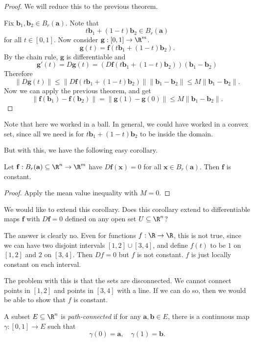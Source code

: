 \documentclass[a4paper]{article}
\begin{document}
\begin{proof}
  We will reduce this to the previous theorem.

  Fix $\mathbf{b}_1, \mathbf{b}_2 \in B_r(\mathbf{a})$. Note that
  \[
    t\mathbf{b}_1 + (1 - t) \mathbf{b}_2 \in B_r(\mathbf{a})
  \]
  for all $t \in [0, 1]$. Now consider $\mathbf{g}: [0, 1] \to \R^m$.
  \[
    \mathbf{g}(t) = \mathbf{f}(t \mathbf{b}_1 + (1 - t)\mathbf{b}_2).
  \]
  By the chain rule, $\mathbf{g}$ is differentiable and
  \[
    \mathbf{g}'(t) = D\mathbf{g}(t) = (D\mathbf{f} (t \mathbf{b}_1 + (1 - t) \mathbf{b}_2))(\mathbf{b}_1 - \mathbf{b}_2)
  \]
  Therefore
  \[
    \|D \mathbf{g}(t)\| \leq \|D \mathbf{f}(t \mathbf{b}_1 + (1 - t)\mathbf{b}_2)\| \|\mathbf{b}_1 - \mathbf{b}_2\| \leq M \|\mathbf{b}_1 - \mathbf{b}_2\|.
  \]
  Now we can apply the previous theorem, and get
  \[
    \|\mathbf{f}(\mathbf{b}_1) - \mathbf{f}(\mathbf{b}_2)\| = \|\mathbf{g}(1) - \mathbf{g}(0)\| \leq M\|\mathbf{b}_1 - \mathbf{b}_2\|.
  \]
\end{proof}
Note that here we worked in a ball. In general, we could have worked in a convex set, since all we need is for $t \mathbf{b}_1 + (1 - t)\mathbf{b}_2$ to be inside the domain.

But with this, we have the following easy corollary.
\begin{cor}
  Let $\mathbf{f}: B_r(\mathbf{a}) \subseteq \R^n \to \R^m$ have $D\mathbf{f}(\mathbf{x}) = 0$ for all $\mathbf{x} \in B_r(\mathbf{a})$. Then $\mathbf{f}$ is constant.
\end{cor}

\begin{proof}
  Apply the mean value inequality with $M = 0$.
\end{proof}

We would like to extend this corollary. Does this corollary extend to differentiable maps $\mathbf{f}$ with $D\mathbf{f} = 0$ defined on any open set $U \subseteq \R^n$?

The answer is clearly no. Even for functions $f: \R \to \R$, this is not true, since we can have two disjoint intervals $[1, 2] \cup [3, 4]$, and define $f(t)$ to be $1$ on $[1, 2]$ and $2$ on $[3, 4]$. Then $Df = 0$ but $f$ is not constant. $f$ is just locally constant on each interval.

The problem with this is that the sets are disconnected. We cannot connect points in $[1, 2]$ and points in $[3, 4]$ with a line. If we can do so, then we would be able to show that $f$ is constant.

\begin{defi}
  A subset $E \subseteq \R^n$ is \emph{path-connected} if for any $\mathbf{a}, \mathbf{b} \in E$, there is a continuous map $\gamma: [0, 1] \to E$ such that
  \[
    \gamma(0) = \mathbf{a}, \quad \gamma(1) = \mathbf{b}.
  \]
\end{defi}
\end{document}
